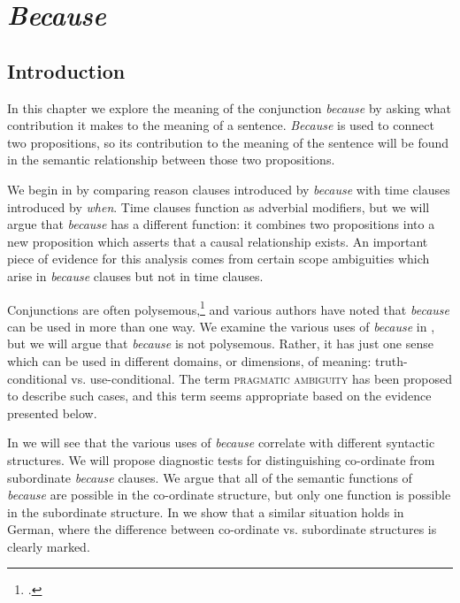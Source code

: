 \chapter{\textit{Because}}\label{sec:18}

\section{Introduction}\label{sec:18.1}

In this chapter we explore the meaning of the conjunction \textit{because} by asking what contribution it makes to the meaning of a sentence. \textit{Because} is used to connect two propositions, so its contribution to the meaning of the sentence will be found in the semantic relationship between those two propositions.



We begin in  by comparing reason clauses introduced by \textit{because} with time clauses introduced by \textit{when}. Time clauses function as adverbial modifiers, but we will argue that \textit{because} has a different function: it combines two propositions into a new proposition which asserts that a causal relationship exists. An important piece of evidence for this analysis comes from certain scope ambiguities which arise in \textit{because} clauses but not in time clauses.



Conjunctions are often polysemous,\footnote{\citet{Aikhenvald2009}.} and various authors have noted that \textit{because} can be used in more than one way. We examine the various uses of \textit{because} in , but we will argue that \textit{because} is not polysemous. Rather, it has just one sense which can be used in different domains, or dimensions, of meaning: truth-conditional vs. use-conditional. The term \textsc{pragmatic ambiguity} has been proposed to describe such cases, and this term seems appropriate based on the evidence presented below.



In  we will see that the various uses of \textit{because} correlate with different syntactic structures. We will propose diagnostic tests for distinguishing co-ordinate from subordinate \textit{because} clauses. We argue that all of the semantic functions of \textit{because} are possible in the co-ordinate structure, but only one function is possible in the subordinate structure. In  we show that a similar situation holds in German, where the difference between co-ordinate vs. subordinate structures is clearly marked.


